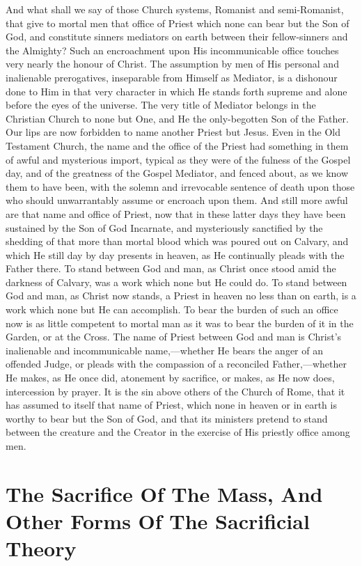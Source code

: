 \documentclass[]{book}
\begin{document}
And what shall we say of those Church systems, Romanist and semi-Romanist, that give to mortal men that office of Priest which none can bear but the Son of God, and constitute sinners mediators on earth between their fellow-sinners and the Almighty? Such an encroachment upon His incommunicable office touches very nearly the honour of Christ. The assumption by men of His personal and inalienable prerogatives, inseparable from Himself as Mediator, is a dishonour done to Him in that very character in which He stands forth supreme and alone before the eyes of the universe. The very title of Mediator belongs in the Christian Church to none but One, and He the only-begotten Son of the Father. Our lips are now forbidden to name another Priest but Jesus. Even in the Old Testament Church, the name and the office of the Priest had something in them of awful and mysterious import, typical as they were of the fulness of the Gospel day, and of the greatness of the Gospel Mediator, and fenced about, as we know them to have been, with the solemn and irrevocable sentence of death upon those who should unwarrantably assume or encroach upon them. And still more awful are that name and office of Priest, now that in these latter days they have been sustained by the Son of God Incarnate, and mysteriously sanctified by the shedding of that more than mortal blood which was poured out on Calvary, and which He still day by day presents in heaven, as He continually pleads with the Father there. To stand between God and man, as Christ once stood amid the darkness of Calvary, was a work which none but He could do. To stand between God and man, as Christ now stands, a Priest in heaven no less than on earth, is a work which none but He can accomplish. To bear the burden of such an office now is as little competent to mortal man as it was to bear the burden of it in the Garden, or at the Cross. The name of Priest between God and man is Christ's inalienable and incommunicable name,---whether He bears the anger of an offended Judge, or pleads with the compassion of a reconciled Father,---whether He makes, as He once did, atonement by sacrifice, or makes, as He now does, intercession by prayer. It is the sin above others of the Church of Rome, that it has assumed to itself that name of Priest, which none in heaven or in earth is worthy to bear but the Son of God, and that its ministers pretend to stand between the creature and the Creator in the exercise of His priestly office among men.

\hypertarget{the-sacrifice-of-the-mass-and-other-forms-of-the-sacrificial-theory}{%
\section{The Sacrifice Of The Mass, And Other Forms Of The Sacrificial Theory}\label{the-sacrifice-of-the-mass-and-other-forms-of-the-sacrificial-theory}}
\end{document}
